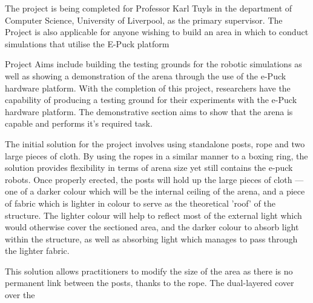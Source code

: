 The project is being completed for Professor Karl Tuyls in the
department of Computer Science, University of Liverpool, as the primary
supervisor.  The Project is also applicable for anyone wishing to build an area
in which to conduct simulations that utilise the E-Puck platform\cite{ePuckSite}

Project Aims include building the testing grounds for the robotic simulations as
well as showing a demonstration of the arena through the use of the e-Puck
hardware platform.  With the completion of this project, researchers have the
capability of producing a testing ground for their experiments with the e-Puck
hardware platform.  The demonstrative section aims to show that the arena is
capable and performs it's required task.

The initial solution for the project involves using standalone posts, rope and
two large pieces of cloth.  By using the ropes in a similar manner to a boxing
ring, the solution provides flexibility in terms of arena size yet still 
contains the e-puck robots.  Once properly erected, the posts will hold up the
large pieces of cloth --- one of a darker colour which will be the internal
ceiling of the arena, and a piece of fabric which is lighter in colour to serve
as the theoretical 'roof' of the structure.  The lighter colour will help to
reflect most of the external light which would otherwise cover the sectioned
area, and the darker colour to absorb light within the structure, as well as
absorbing light which manages to pass through the lighter fabric.

This solution allows practitioners to modify the size of the area as there is no
permanent link between the posts, thanks to the rope.  The dual-layered cover
over the 
